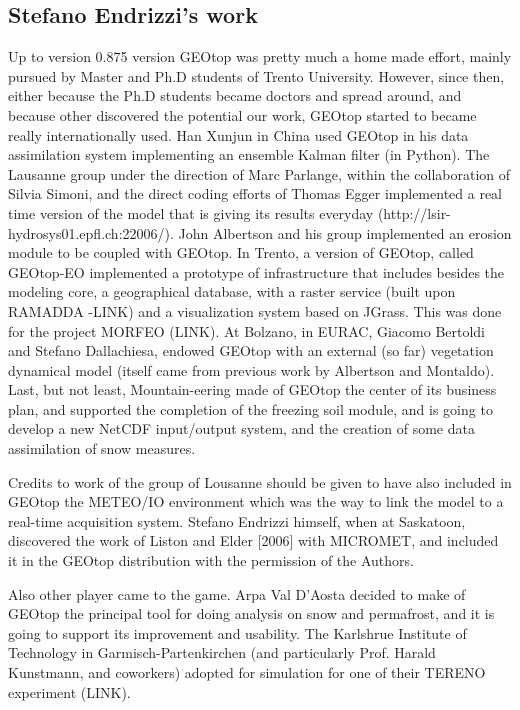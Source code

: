 \subsection{Stefano Endrizzi's work}

Up to version 0.875 version GEOtop was pretty much a home made effort, mainly pursued by Master and Ph.D students of Trento University. However, since then, either because the Ph.D students became doctors and spread around, and because other discovered the potential our work, GEOtop started to became really internationally used. Han Xunjun in China used GEOtop in his data assimilation system implementing an ensemble Kalman filter (in Python). The Lausanne group under the direction of Marc Parlange, within the collaboration of Silvia Simoni, and the direct coding efforts of Thomas Egger implemented a real time version of the model that is giving its results everyday (http://lsir-hydrosys01.epfl.ch:22006/). John Albertson and his group implemented an erosion module to be coupled with GEOtop. In Trento, a version of GEOtop, called GEOtop-EO implemented a prototype of  infrastructure that includes besides the modeling core, a geographical database, with a raster service (built upon RAMADDA -LINK) and a visualization system based on JGrass. This was done for the project MORFEO (LINK).  At Bolzano, in EURAC, Giacomo Bertoldi and Stefano Dallachiesa, endowed GEOtop with an external (so far) vegetation dynamical model (itself came from previous work by Albertson and Montaldo). Last, but not least, Mountain-eering made of GEOtop the center of its business plan, and supported the completion of the freezing soil module, and is going to develop a new NetCDF input/output system, and the creation of some data assimilation of snow measures. 

Credits to work of the group of Lousanne should be given to have also included in GEOtop the METEO/IO environment which was the way to link the model to a real-time acquisition system.  Stefano Endrizzi himself, when at Saskatoon, discovered the work of Liston and Elder [2006] with MICROMET, and included it in the GEOtop distribution with the permission of the Authors. 

Also other player came  to the game. Arpa Val D'Aosta decided to make of GEOtop the principal tool for doing analysis on snow and permafrost, and it is going to support its improvement and usability. The Karlshrue Institute of Technology in Garmisch-Partenkirchen (and particularly Prof. Harald Kunstmann, and coworkers) adopted for simulation for one of their TERENO experiment (LINK).  

